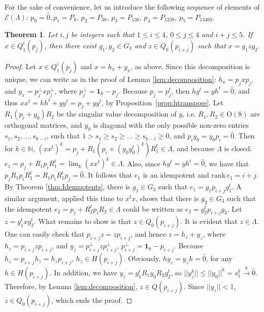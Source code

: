 \documentclass[12pt]{article}
\theoremstyle{plain}
\newtheorem{theorem}{Theorem}
\theoremstyle{definition}
\theoremstyle{remark}
\numberwithin{equation}{section}
\begin{document}
For the sake of convenience, let us introduce the following sequence
of elements of $\mathcal{E}(\Lambda)$:
$p_{0} = \hat{0}, p_{1} = P_{8}$, $p_{2} = P_{38}$,
$p_{3} = P_{138}$, $p_{4} = P_{1238}$, $p_{5} = P_{13468}$.

\begin{theorem}
\label{thm:LowerIndices}
    Let $i,j$  be integers such that
    $1 \leq i \leq 4$, $0 \leq j \leq 4$ and $i+j \leq 5$.
    If $x \in Q_{1}^{i}(p_{j})$,
    then there exist $g_{1}, g_{2} \in G_{3}$ and $z \in Q_{0}(p_{i+j})$ 
    such that $x = g_{1} z g_{2}$.
\end{theorem}
\begin{proof}
    Let $x \in Q_{1}^{i}(p_{j})$ and
    $x = h_{x} + y_{x}$, as above.
    Since this decomposition is unique, we can write as in the proof of
    Lemma \ref{lem:decomposition}:
    $h_{x} = p_{j} x p_{j}$, and $y_{x} = p_{j}^{\perp} x p_{j}^{\perp}$,
    where $p_{j}^{\perp} = \mathbf{1}_{8} - p_{j}$.
    Because $p_{j} = p_{j}^{t}$, then
    $h y^{t} = y h^{t} = \hat{0}$, and thus
    $x x^{t}  = h h^{t} + y y^{t} = p_{j} + y y^{t}$,
    by \mbox{Proposition \ref{prop:htranspose}}.
    Let $R_{1} (p_{i} + y_{0}) R_{2}$ be the singular value decomposition of $y$,
    i.e. $R_{1}, R_{2}  \in \text{O}(8)$ are orthogonal matrices,
    and $y_{0}$ is diagonal with the only possible non-zero entries $s_{1}, s_{2}, \ldots, s_{8-i}$,
    such that $1 > s_{1} \geq s_{2} \geq \ldots \geq s_{8-i} \geq 0$,
    and $p_{i} y_{0} = y_{0} p_{i} = \hat{0}$.
    Then for $k \in \mathbb{N}$,
    $(x x^{t})^{k} = p_{j} + R_{1}( p_{i} + (y_{0} y_{0}^{t})^{k}) R_{1}^{t} \in \Lambda$,
    and  because $\Lambda$ is closed:
    $e_{1} = p_{j} + R_{1} p_{i} R_{1}^{t} = \lim_{k} (x x^{t})^{k} \in \Lambda$.
    Also, since $h y^{t} = y h^{t} = \hat{0}$,
    we have that $p_{j} R_{1} p_{i} R_{1}^{t} = R_{1} p_{i} R_{1}^{t} p_{j} = \hat{0}$.
    It follows that $e_{1}$ is an idempotent and $\text{rank} \, e_{1} = i+j$.
    By Theorem \ref{thm:Idempotents}, there is $g_{1} \in G_{3}$ such that
    $e_{1} = g_{1} p_{i+j} g_{1}^{t}$.
    A similar argument,
    applied this time to $x^{t} x$, shows that there is $g_{2} \in G_{3}$ 
    such that the idempotent $e_{2} = p_{j} + R_{2}^{t} p_{i} R_{2} \in \Lambda$
    could be written as $e_{2} = g_{2}^{t} p_{i+j} g_{2}$.
    Let $z = g_{1}^{t} x g_{2}^{t}$.
    What remains to show is that $z \in Q_{0}(p_{i+j})$.
    It is evident that $z \in \Lambda$.
    One can easily check that
    $p_{i+j} z = z p_{i+j}$,
    and hence $z = h_{z} + y_{z}$,
    where $h_{z} = p_{i+j} z p_{i+j}$,
    and $y_{z} = p_{i+j}^{\perp} z p_{i+j}^{\perp}$,
    $p_{i+j}^{\perp} = \mathbf{1}_{8} - p_{i+j}$.
    Because $h_{z} = p_{i+j} h_{z} = h_{z} p_{i+j}$,
    $h_{z} \in H(p_{i+j})$.
    Obviously, $h y_{z} = y_{z} h = \hat{0}$, for any $h \in H(p_{i+j})$.
    In addition, we have
    $y_{z} = g_{1}^{t}R_{1} y_{0} R_{2} g_{2}^{t}$,
    so $||y_{z}^{k}|| \leq ||y_{0}||^{k} = s_{1}^{k} \overset{k}{\rightarrow} \hat{0}$.
    Therefore, by Lemma \ref{lem:decomposition},
    $z \in Q(p_{i+j})$.
    Since $||y_{z}|| < 1$,
    $z \in Q_{0}(p_{i+j})$, which ends the proof.
\end{proof}
\end{document}
